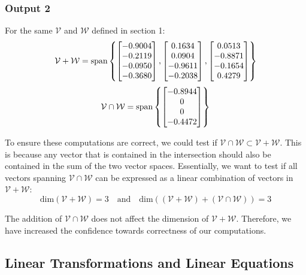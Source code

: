 \documentclass[10pt]{article}
\begin{document}
\subsubsection{Output 2}
For the same $\mathcal{V}$ and $\mathcal{W}$ defined in section 1:
\begin{equation*}
    {\mathcal{V} + \mathcal{W}} = \text{span}
    \begin{Bmatrix}
        \begin{bmatrix} -0.9004\\-0.2119\\-0.0950\\-0.3680 \end{bmatrix},
        \begin{bmatrix} 0.1634\\0.0904\\-0.9611\\-0.2038 \end{bmatrix},
        \begin{bmatrix} 0.0513\\-0.8871\\-0.1654\\0.4279 \end{bmatrix}
    \end{Bmatrix}
\end{equation*}
\begin{equation*}
    {\mathcal{V} \cap \mathcal{W}} = \text{span}
    \begin{Bmatrix}
        \begin{bmatrix} -0.8944\\0\\0\\-0.4472 \end{bmatrix}
    \end{Bmatrix}
\end{equation*}

To ensure these computations are correct, we could test if ${\mathcal{V} \cap \mathcal{W}} \subset \mathcal{V} + \mathcal{W}$. This is because any vector that is contained in the intersection should also be contained in the sum of the two vector spaces. Essentially, we want to test if all vectors spanning ${\mathcal{V} \cap \mathcal{W}}$ can be expressed as a linear combination of vectors in $\mathcal{V} + \mathcal{W}$:
\begin{equation*}
    \text{dim}(\mathcal{V} + \mathcal{W}) = 3
    \quad
    \text{and}
    \quad
    \text{dim}\left((\mathcal{V} + \mathcal{W}) + (\mathcal{V} \cap \mathcal{W})\right) = 3
\end{equation*}

The addition of $\mathcal{V} \cap \mathcal{W}$ does not affect the dimension of $\mathcal{V} + \mathcal{W}$. Therefore, we have increased the confidence towards correctness of our computations.

\subsection{Linear Transformations and Linear Equations}
\end{document}
